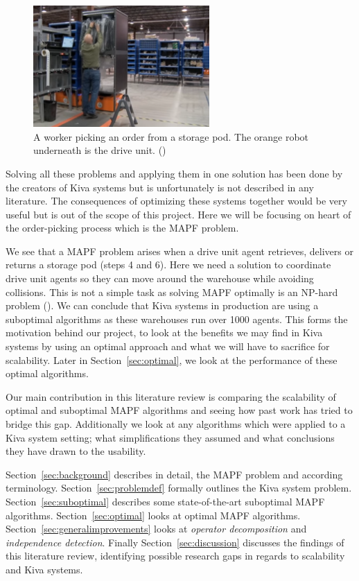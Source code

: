 \documentclass[a4paper,11pt]{article}
\begin{document}
\begin{figure}[h!]
	\centering
	\includegraphics[width=0.6\textwidth ]{graphics/kivaprocess}
	\caption{A worker picking an order from a storage pod. The orange robot underneath is the drive unit. (\cite{kivayoutube2010quietlogistics})}
	\label{fig:kivaprocess}
\end{figure}

Solving all these problems and applying them in one solution has been done by the creators of Kiva systems but is unfortunately is not described in any literature. The consequences of optimizing these systems together would be very useful but is out of the scope of this project. Here we will be focusing on heart of the order-picking process which is the MAPF problem.


We see that a MAPF problem arises when a drive unit agent retrieves, delivers or returns a storage pod (steps 4 and 6). Here we need a solution to coordinate drive unit agents so they can move around the warehouse while avoiding collisions. This is not a simple task as solving MAPF optimally is an NP-hard problem (\cite{yu2013structure}). We can conclude that Kiva systems in production are using a suboptimal algorithms as these warehouses run over 1000 agents. This forms the motivation behind our project, to look at the benefits we may find in Kiva systems by using an optimal approach and what we will have to sacrifice for scalability. Later in Section~\ref{sec:optimal}, we look at the performance of these optimal algorithms.

Our main contribution in this literature review is comparing the scalability of optimal and suboptimal MAPF algorithms and seeing how past work has tried to bridge this gap. Additionally we look at any algorithms which were applied to a Kiva system setting; what simplifications they assumed and what conclusions they have drawn to the usability. 

Section~\ref{sec:background} describes in detail, the MAPF problem and according terminology. Section~\ref{sec:problemdef} formally outlines the Kiva system problem. Section~\ref{sec:suboptimal} describes some state-of-the-art suboptimal MAPF algorithms. Section~\ref{sec:optimal} looks at optimal MAPF algorithms. Section~\ref{sec:generalimprovements} looks at \textit{operator decomposition} and \textit{independence detection}. Finally Section~\ref{sec:discussion} discusses the findings of this literature review, identifying possible research gaps in regards to scalability and Kiva systems.
\end{document}
